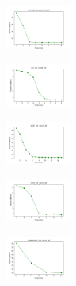 \begin{figure}[H]
\begin{subfigure}
    \end{subfigure}
    \hfill
    \begin{subfigure}
        \centering
        \includegraphics[width=0.234\textwidth]{img/es/newthyroid_set_const_20_277451237_cost.png}
    \end{subfigure}
    \hfill
    \begin{subfigure}
        \centering
        \includegraphics[width=0.234\textwidth]{img/es/iris_set_const_20_49258669_cost.png}
    \end{subfigure}
    \hfill
    \begin{subfigure}
        \centering
        \includegraphics[width=0.234\textwidth]{img/es/ecoli_set_const_20_49258669_cost.png}
    \end{subfigure}
    \hfill
    \begin{subfigure}
        \centering
        \includegraphics[width=0.234\textwidth]{img/es/rand_set_const_20_49258669_cost.png}
    \end{subfigure}
    \hfill
    \begin{subfigure}
        \centering
        \includegraphics[width=0.234\textwidth]{img/es/newthyroid_set_const_20_49258669_cost.png}
    \end{subfigure}
    \hfill
    \begin{subfigure}

\end{subfigure}
\end{figure}
